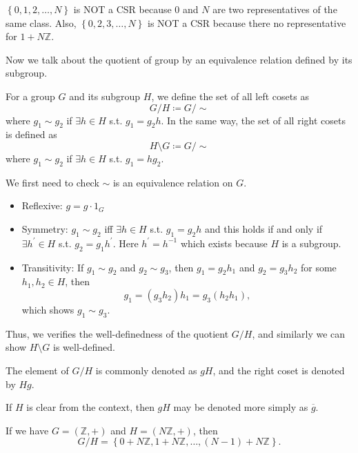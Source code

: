 \begin{eg}
    \(\left\{ 0,1,2, \dots ,N \right\} \) is NOT a CSR because \(0\) and \(N\) are two representatives of the same class. Also, \(\left\{ 0, 2,3, \dots , N \right\} \) is NOT a CSR because there no representative for \(1 + N \mathbb{Z} \).      
\end{eg}

Now we talk about the quotient of group by an equivalence relation defined by its subgroup. 

\begin{definition}
    For a group \(G\) and its subgroup \(H\), we define the set of all left cosets as 
    \[
        G / H \coloneqq  G / \sim 
    \] where \(g_1 \sim g_2\) if \(\exists h \in H\) s.t. \(g_1 = g_2 h\). In the same way, the set of all right cosets is defined as 
    \[
        H \setminus G \coloneqq G / \sim 
    \]  where \(g_1 \sim g_2\) if \(\exists h \in H\) s.t. \(g_1 = h g_2\).      
\end{definition}

We first need to check \(\sim \) is an equivalence relation on \(G\). 
\begin{itemize}
    \item Reflexive: \(g = g \cdot 1_G\) 
    \item Symmetry: \(g_1 \sim g_2\) iff \(\exists h \in H\) s.t. \(g_1 = g_2 h\) and this holds if and only if \(\exists h^{\prime} \in H\) s.t. \( g_2 = g_1 h^{\prime} \). Here \(h^{\prime} = h^{-1} \) which exists because \(H\) is a subgroup. 
    \item Transitivity: If \(g_1 \sim g_2\) and \(g_2 \sim g_3\), then \(g_1 = g_2 h_1 \) and \(g_2 = g_3 h_2\) for some \(h_1, h_2 \in H\), then 
    \[
        g_1 = (g_3 h_2)h_1 = g_3 (h_2 h_1),
    \]  which shows \(g_1 \sim g_3\).         
\end{itemize}  
Thus, we verifies the well-definedness of the quotient \(G / H\), and similarly we can show \(H \setminus G\) is well-defined. 

\begin{notation}
    The element of \(G / H \) is commonly denoted as \(gH\), and the right coset is denoted by \(Hg\).    
\end{notation}

\begin{note}
    If \(H\) is clear from the context, then \(gH\) may be denoted more simply as \(\overline{g} \). 
\end{note}  

\begin{eg}
    If we have \(G = (\mathbb{Z} , +)\) and \(H = (N \mathbb{Z} , +)\), then 
    \[
        G / H = \left\{ 0 + N \mathbb{Z} , 1 + N \mathbb{Z} , \dots , (N - 1) + N \mathbb{Z}  \right\}. 
    \]
\end{eg}

